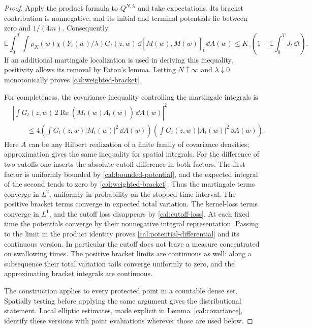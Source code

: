 \begin{proof}
Apply the product formula to $Q^{N,\lambda}$ and take expectations.
Its bracket contribution is nonnegative, and its initial and terminal
potentials lie between zero and $1/(4m)$.  Consequently
\[
 \mathbb E\int_0^T\int
 \rho_N(w)\chi(Y_t(w)/\lambda)G_t(z,w)
                \,\dd[M(w),\overline{M(w)}]_t\,\dd A(w)
 \leq K_z\left(1+\mathbb E\int_0^T J_t\,\dd t\right).
\]
If an additional martingale localization is used in deriving this
inequality, positivity allows its removal by Fatou's lemma.
Letting $N\uparrow\infty$ and $\lambda\downarrow0$ monotonically
proves \eqref{cal:weighted-bracket}.

For completeness, the covariance inequality controlling the
martingale integrals is
\begin{equation}
 \begin{aligned}
 &\left|\int G_t(z,w)\,2\operatorname{Re}
                         (\overline{M_t(w)}A_t(w))\,\dd A(w)\right|^2\\
 &\qquad\leq 4\left(\int G_t(z,w)|M_t(w)|^2\,\dd A(w)\right)
         \left(\int G_t(z,w)|A_t(w)|^2\,\dd A(w)\right).
 \end{aligned}
 \label{cal:weighted-isometry}
\end{equation}
Here $A$ can be any Hilbert realization of a finite family of
covariance densities; approximation gives the same inequality for
spatial integrals.  For the difference of two cutoffs one inserts the
absolute cutoff difference in both factors.  The first factor is
uniformly bounded by \eqref{cal:bounded-potential}, and the expected
integral of the second tends to zero by
\eqref{cal:weighted-bracket}.  Thus the martingale terms converge in
$L^2$, uniformly in probability on the stopped time interval.  The
positive bracket terms converge in expected total variation.  The
kernel-loss terms converge in $L^1$, and the cutoff loss disappears
by \eqref{cal:cutoff-loss}.  At each fixed time the potentials converge
by their nonnegative integral representation.  Passing to the limit
in the product identity proves \eqref{cal:potential-differential} and
its continuous version.  In particular the cutoff does not leave a
measure concentrated on swallowing times.  The positive bracket
limits are continuous as well: along a subsequence their total
variation tails converge uniformly to zero, and the approximating
bracket integrals are continuous.

The construction applies to every protected point in a countable
dense set.  Spatially testing before applying the same argument gives
the distributional statement.  Local elliptic estimates, made
explicit in Lemma~\ref{cal:covariance}, identify these versions with
point evaluations wherever those are used below.
\end{proof}


